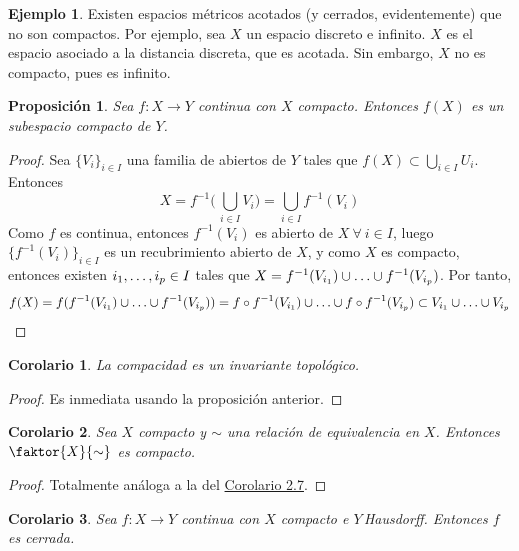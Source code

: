 \documentclass[12pt]{report}
\newtheorem{proposition}{Proposición}[chapter]
\newtheorem{corollary}{Corolario}[chapter]
\theoremstyle{definition}
\theoremstyle{definition}
\newtheorem{example}{Ejemplo}[chapter]
\theoremstyle{remark}
\begin{document}
\begin{example}
Existen espacios métricos acotados (y cerrados, evidentemente) que no son compactos. Por ejemplo, sea $X$ un espacio discreto e infinito. $X$ es el espacio asociado a la distancia discreta, que es acotada. Sin embargo, $X$ no es compacto, pues es infinito.
\end{example}

\begin{proposition}
Sea $f \colon X \to Y$ continua con $X$ compacto. Entonces $f(X)$ es un subespacio compacto de $Y$.
\end{proposition}

\begin{proof}
Sea $\{V_i\}_{i \in I}$ una familia de abiertos de $Y$ tales que $f(X) \subset \bigcup_{i \in I}U_i$. Entonces
\[X = f^{-1} \biggl( \, \bigcup_{i \in I}V_i \biggr) = \bigcup_{i \in I}f^{-1}(V_i)\]
Como $f$ es continua, entonces $f^{-1}(V_i)$ es abierto de $X \ \forall \ i \in I$, luego $\{f^{-1}(V_i)\}_{i \in I}$ es un recubrimiento abierto de $X$, y como $X$ es compacto, entonces existen $i_1,\mathellipsis,i_p \in I$ tales que $X = f^{-1}(V_{i_1}) \cup \mathellipsis \cup f^{-1}(V_{i_p})$. Por tanto,
\[f(X) = f(f^{-1}(V_{i_1}) \cup \mathellipsis \cup f^{-1}(V_{i_p})) = f \circ f^{-1}(V_{i_1}) \cup \mathellipsis 
 \cup f \circ f^{-1}(V_{i_p}) \subset V_{i_1} \cup \mathellipsis \cup V_{i_p}\]
\end{proof}

\begin{corollary}
La compacidad es un invariante topológico.
\end{corollary}

\begin{proof}
Es inmediata usando la proposición anterior.
\end{proof}

\begin{corollary}
Sea $X$ compacto y $\sim$ una relación de equivalencia en $X$. Entonces $\faktor{X}{\sim}$ es compacto.
\end{corollary}

\begin{proof}
Totalmente análoga a la del \hyperref[cor2.7.]{\color{blue}Corolario 2.7}.
\end{proof}

\begin{corollary}
\label{cor3.4.}
Sea $f \colon X \to Y$ continua con $X$ compacto e $Y \,$Hausdorff. Entonces $f$ es cerrada.
\end{corollary}
\end{document}
